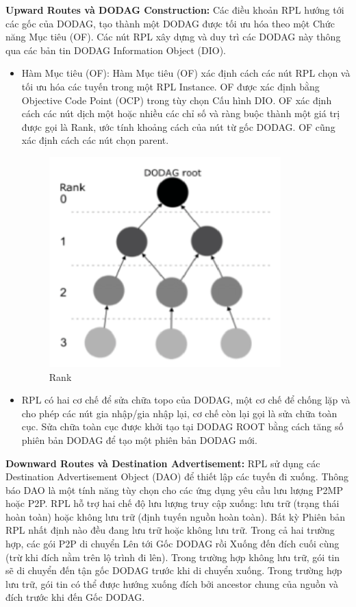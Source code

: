 \documentclass{report}
\begin{document}
\textbf{Upward Routes và DODAG Construction:} Các điều khoản RPL hướng tới các gốc của DODAG, tạo thành một DODAG được tối ưu hóa theo một Chức năng Mục tiêu (OF). Các nút RPL xây dựng và duy trì các DODAG này thông qua các bản tin DODAG Information Object (DIO).
\begin{itemize}
	\item Hàm Mục tiêu (OF): Hàm Mục tiêu (OF) xác định cách các nút RPL chọn và tối ưu hóa các tuyến trong một RPL Instance. OF được xác định bằng Objective Code Point (OCP) trong tùy chọn Cấu hình DIO. OF xác định cách các nút dịch một hoặc nhiều các chỉ số và ràng buộc thành một giá trị được gọi là Rank, ước tính khoảng cách của nút từ gốc DODAG. OF cũng xác định cách các nút chọn parent. 
	\begin{figure}[h]
		\centering
		\includegraphics[scale = 0.7]{fig20.png}
		\caption{Rank}
		\label{fig:Graph20}
	\end{figure}
	\item RPL có hai cơ chế để sửa chữa topo của DODAG, một cơ chế để chống lặp và cho
	phép các nút gia nhập/gia nhập lại, cơ chế còn lại gọi là sửa chữa toàn cục. Sửa
	chữa toàn cục được khởi tạo tại DODAG ROOT bằng cách tăng số phiên bản
	DODAG để tạo một phiên bản DODAG mới.
\end{itemize}

\textbf{Downward Routes và Destination Advertisement:} RPL sử dụng các Destination Advertisement Object (DAO) để thiết lập các tuyến đi xuống. Thông báo DAO là một tính năng tùy chọn cho các ứng dụng yêu cầu lưu lượng P2MP hoặc P2P. RPL hỗ trợ hai chế độ lưu lượng truy cập xuống: lưu trữ (trạng thái hoàn toàn) hoặc không lưu trữ (định tuyến nguồn hoàn toàn). Bất kỳ Phiên bản RPL nhất định nào đều đang lưu trữ hoặc không lưu trữ. Trong cả hai trường hợp, các gói P2P di chuyển Lên tới Gốc DODAG rồi Xuống đến đích cuối cùng (trừ khi đích nằm trên lộ trình đi lên). Trong trường hợp không lưu trữ, gói tin sẽ di chuyển đến tận gốc DODAG trước khi di chuyển xuống. Trong trường hợp lưu trữ, gói tin có thể được hướng xuống đích bởi ancestor chung của nguồn và đích trước khi đến Gốc DODAG. \\
\end{document}
